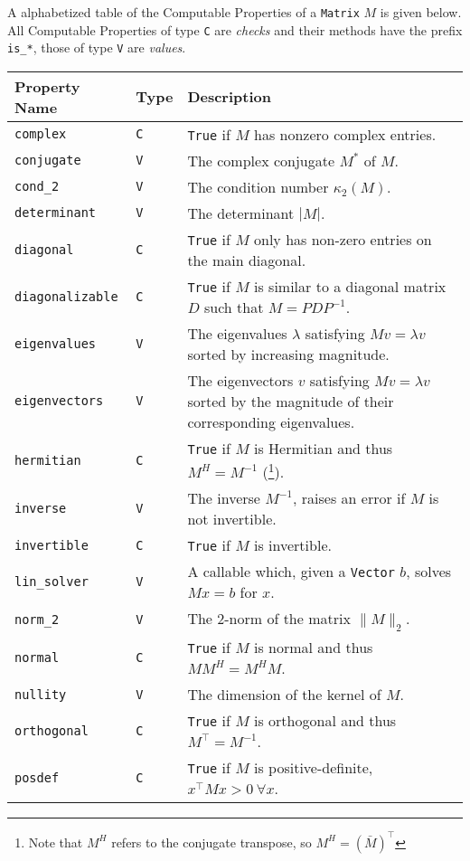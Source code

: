 \documentclass[12pt,a4paper]{article}
\newcommand{\ct}[1]{\texttt{#1}}
\begin{document}
A alphabetized table of the Computable Properties of a \ct{Matrix} $M$ is given below. All Computable Properties of type \ct{C} are \textit{checks} and their methods have the prefix \ct{is\_*}, those of type \ct{V} are \textit{values}.
\begin{longtable}[c]{p{3.5cm}|p{1.25cm}|p{9cm}}
\textbf{Property Name} & \textbf{Type} & \textbf{Description} \\ \hline
\ct{complex} & \ct{C} & \ct{True} if $M$ has nonzero complex entries. \\
\ct{conjugate} & \ct{V} & The complex conjugate $M^*$ of $M$. \\
\ct{cond\_2} & \ct{V} & The condition number $\kappa_2(M)$. \\
\ct{determinant} & \ct{V} & The determinant $| M |$. \\
\ct{diagonal} & \ct{C} & \ct{True} if $M$ only has non-zero entries on the main diagonal. \\
\ct{diagonalizable} & \ct{C} & \ct{True} if $M$ is similar to a diagonal matrix $D$ such that $M = P D P^{-1}$. \\
\ct{eigenvalues} & \ct{V} & The eigenvalues $\lambda$ satisfying $Mv = \lambda v$ sorted by increasing magnitude. \\
\ct{eigenvectors} & \ct{V} & The eigenvectors $v$ satisfying $Mv = \lambda v$ sorted by the magnitude of their corresponding eigenvalues. \\
\ct{hermitian} & \ct{C} & \ct{True} if $M$ is Hermitian and thus $M^H = M^{-1}$ (\footnote{Note that $M^H$ refers to the conjugate transpose, so $M^H = \left(\bar{M}\right)^\top$}). \\
\ct{inverse} & \ct{V} & The inverse $M^{-1}$, raises an error if $M$ is not invertible. \\
\ct{invertible} & \ct{C} & \ct{True} if $M$ is invertible. \\
\ct{lin\_solver} & \ct{V} & A callable which, given a \ct{Vector} $b$, solves $Mx = b$ for $x$. \\
\ct{norm\_2} & \ct{V} & The 2-norm of the matrix $\lVert M \rVert_2$. \\
\ct{normal} & \ct{C} & \ct{True} if $M$ is normal and thus $M M^H = M^H M$. \\
\ct{nullity} & \ct{V} & The dimension of the kernel of $M$. \\
\ct{orthogonal} & \ct{C} & \ct{True} if $M$ is orthogonal and thus $M^\top = M^{-1}$. \\
\ct{posdef} & \ct{C} & \ct{True} if $M$ is positive-definite, $x^\top M x > 0 \: \forall x$. \\

\end{longtable}
\end{document}
